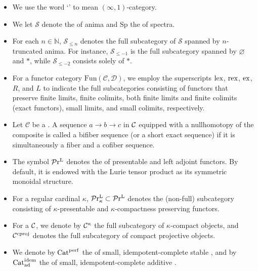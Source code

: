 \documentclass[a4paper,10pt, oneside]{amsart}
\begin{document}
\begin{itemize}%
	\item We use the word `\infcat' to mean $(\infty,1)$-category. 

	\item We let $\mathcal{S}$ denote the \infcat of anima and $\mathrm{Sp}$ the \infcat of spectra.
	
	\item For each $n \in \mathbb{N}$, $\mathcal{S}_{\leq n}$ denotes the full subcategory of $\mathcal{S}$ spanned by $n$-truncated anima. For instance, $\mathcal{S}_{\leq -1}$ is the full subcategory spanned by $\varnothing$ and $*$, while $\mathcal{S}_{\leq -2}$ consists solely of $*$.
	
	\item For a functor category $\mathrm{Fun}(\mathcal{C},\mathcal{D})$, we employ the superscripts $\mathrm{lex}$, $\mathrm{rex}$, $\mathrm{ex}$, $R$, and $L$ to indicate the full subcategories consisting of functors that preserve finite limits, finite colimits, both finite limits and finite colimits (exact functors), small limits, and small colimits, respectively.
	
	\item Let $\mathcal{C}$ be a \infcat. A sequence $a \to b \to c$ in $\mathcal{C}$ equipped with a nullhomotopy of the composite is called a bifiber sequence (or a short exact sequence) if it is simultaneously a fiber and a cofiber sequence.
	
	\item The symbol $\mathcal{P}\mathrm{r}^\mathrm{L}$ denotes the \infcat of presentable \infcats and left adjoint functors. By default, it is endowed with the Lurie tensor product as its symmetric monoidal structure.
	
	\item For a regular cardinal $\kappa$, $\mathcal{P}\mathrm{r}^\mathrm{L}_{\kappa} \subset \mathcal{P}\mathrm{r}^\mathrm{L}$ denotes the (non-full) subcategory consisting of $\kappa$-presentable \infcats and $\kappa$-compactness preserving functors.
	

	
	\item For a \infcat $\mathcal{C}$, we denote by $\mathcal{C}^\kappa$ the full subcategory of $\kappa$-compact objects, and $\mathcal{C}^{\mathrm{cproj}}$ denotes the full subcategory of compact projective objects.
	
	\item We denote by $\mathrm{Cat}^{\mathrm{perf}}$ the \infcat of small, idempotent-complete stable \infcats, and by $\mathrm{Cat}_{\mathrm{ad}}^{\mathrm{idem}}$ the \infcat of small, idempotent-complete additive \infcats.
	

\end{itemize}
\end{document}
